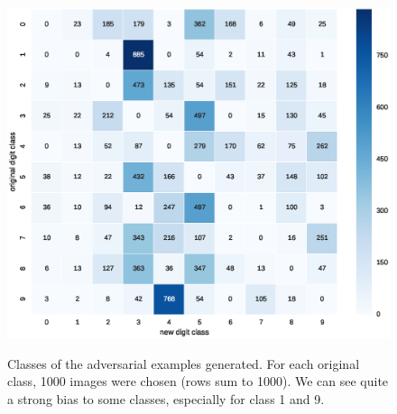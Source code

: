 \documentclass{article} %
\begin{document}
\begin{figure}[h!]
\begin{center}
\includegraphics[scale=0.6]{figs/sup_3}
\label{exp:sup_2_bigger}
\caption{\small Classes of the adversarial examples generated.
For each original class, 1000 images were chosen (rows sum to 1000). We can see quite a strong bias to some classes, especially
for class 1 and 9.}
\end{center}
\end{figure}

\clearpage
\end{document}
